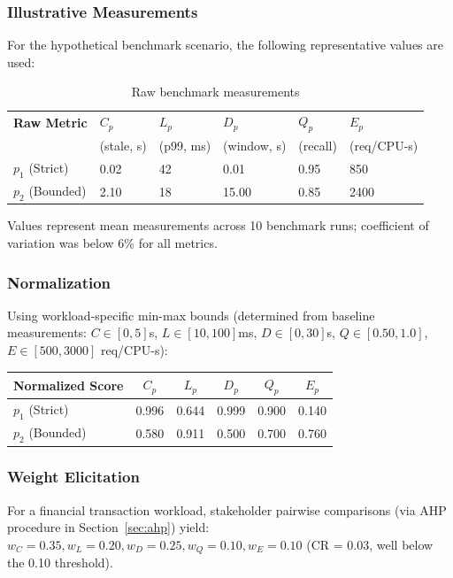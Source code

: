 \documentclass[conference]{IEEEtran}
\begin{document}
\subsubsection{Illustrative Measurements}
For the hypothetical benchmark scenario, the following representative values are used:

\begin{table}[h]
\caption{Raw benchmark measurements}
\centering
\small
\renewcommand{\arraystretch}{1.1}

\begin{tabularx}{\columnwidth}{@{}lXXXXX@{}}
\toprule
\textbf{Raw Metric} &
\textbf{$C_p$} &
\textbf{$L_p$} &
\textbf{$D_p$} &
\textbf{$Q_p$} &
\textbf{$E_p$} \\
&
(stale, s) &
(p99, ms) &
(window, s) &
(recall) &
(req/CPU-s) \\
\midrule
$p_1$ (Strict)  & 0.02 & 42 & 0.01 & 0.95 & 850 \\
$p_2$ (Bounded) & 2.10 & 18 & 15.00 & 0.85 & 2400 \\
\bottomrule
\end{tabularx}
\end{table}

\vspace{-2mm}\noindent\small Values represent mean measurements across 10 benchmark runs; coefficient of variation was below 6\% for all metrics.

\subsubsection{Normalization}
Using workload-specific min-max bounds (determined from baseline measurements: $C \in [0, 5]$s, $L \in [10, 100]$ms, $D \in [0, 30]$s, $Q \in [0.50, 1.0]$, $E \in [500, 3000]$ req/CPU-s):

\begin{table}[h]
\centering
\small
\begin{tabular}{@{}l c c c c c@{}}
\toprule
Normalized Score & $C_p$ & $L_p$ & $D_p$ & $Q_p$ & $E_p$ \\
\midrule
$p_1$ (Strict) & 0.996 & 0.644 & 0.999 & 0.900 & 0.140 \\
$p_2$ (Bounded) & 0.580 & 0.911 & 0.500 & 0.700 & 0.760 \\
\bottomrule
\end{tabular}
\end{table}

\subsubsection{Weight Elicitation}
For a financial transaction workload, stakeholder pairwise comparisons (via AHP procedure in Section~\ref{sec:ahp}) yield:
$w_C = 0.35, w_L = 0.20, w_D = 0.25, w_Q = 0.10, w_E = 0.10$ (CR = 0.03, well below the 0.10 threshold).
\end{document}
